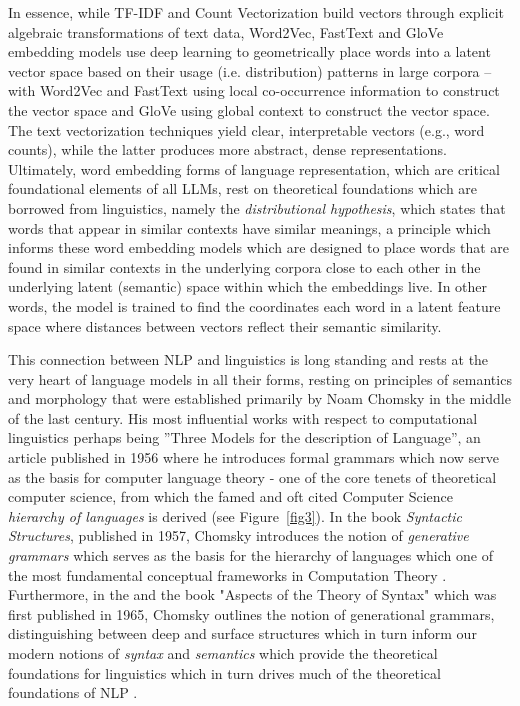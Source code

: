 \documentclass[final]{clv2025-revised}
\begin{document}
In essence, while TF-IDF and Count Vectorization build vectors through explicit algebraic transformations of text data, Word2Vec, FastText and GloVe embedding models use deep learning to geometrically place words into a latent vector space based on their usage (i.e. distribution) patterns in large corpora – with Word2Vec and FastText using local co-occurrence information to construct the vector space and GloVe using global context to construct the vector space. The text vectorization techniques yield clear, interpretable vectors (e.g., word counts), while the latter produces more abstract, dense representations. Ultimately, word embedding forms of language representation, which are critical foundational elements of all LLMs, rest on theoretical foundations which are borrowed from linguistics, namely the \textit{distributional hypothesis}, which states that words that appear in similar contexts have similar meanings, a principle which informs these word embedding models which are designed to place words that are found in similar contexts in the underlying corpora close to each other in the underlying latent (semantic) space within which the embeddings live. In other words, the model is trained to find the coordinates each word in a latent feature space where distances between vectors reflect their semantic similarity.

This connection between NLP and linguistics is long standing and rests at the very heart of language models in all their forms, resting on principles of semantics and morphology that were established primarily by Noam Chomsky in the middle of the last century. His most influential works with respect to computational linguistics perhaps being ''Three Models for the description of Language'', an article published in 1956 where he introduces formal grammars which now serve as the basis for computer language theory \cite{chomsky56} - one of the core tenets of theoretical computer science, from which the famed and oft cited Computer Science \textit{hierarchy of languages} is derived (see Figure~\ref{fig3}). In the book \textit{Syntactic Structures}, published in 1957, Chomsky introduces the notion of \textit{generative grammars} which serves as the basis for the hierarchy of languages which one of the most fundamental conceptual frameworks in Computation Theory \cite{Chomsky57}. Furthermore, in the and the book "Aspects of the Theory of Syntax" which was first published in 1965, Chomsky outlines the notion of generational grammars, distinguishing between deep and surface structures which in turn inform our modern notions of \textit{syntax} and \textit{semantics} which provide the theoretical foundations for linguistics which in turn drives much of the theoretical foundations of NLP \cite{chomsky65aspects}.
\end{document}
